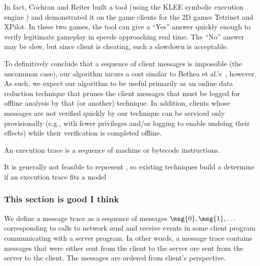 In fact, Cochran and Reiter built a tool (using the KLEE symbolic
execution engine \cite{cadar08:klee}) and demonstrated it on the game
clients for the 2D games Tetrinet and XPilot.  In these two games,
the tool can give a ``Yes'' answer quickly enough to verify
legitimate gameplay in speeds approaching real time.  The ``No''
answer may be slow, but since client is cheating, such a slowdown is
acceptable.

To definitively conclude that a sequence of client messages is
impossible (the uncommon case), our algorithm incurs a cost similar to
Bethea et al.'s~\cite{bethea11:games}, however.  As such, we expect
our algorithm to be useful primarily as an online data reduction
technique that prunes the client messages that must be logged for
offline analysis by that (or another) technique.  In addition, clients
whose messages are not verified quickly by our technique can be
serviced only provisionally (e.g., with fewer privileges and/or
logging to enable undoing their effects) while their verification is
completed offline.


\begin{definition}
  An execution trace \execTrace{} is a sequence of machine or
  bytecode instructions.
\end{definition}


It is generally not feasible to represent , so 
existing techniques build a determine if an execution trace \execTrace{} 
fits a model 

\subsubsection{ This section is good I think}

\begin{definition}
  We define a message trace  as a sequence of messages $\msg{0},
  \msg{1}, \ldots$ corresponding to calls to network send and receive
  events in some client program \program{} communicating with a server
  program. In other words, a message trace contains messages that
  were either sent from the client to the server ore sent from the
  server to the client. The messages are ordered from client's
  perspective.
\end{definition}

